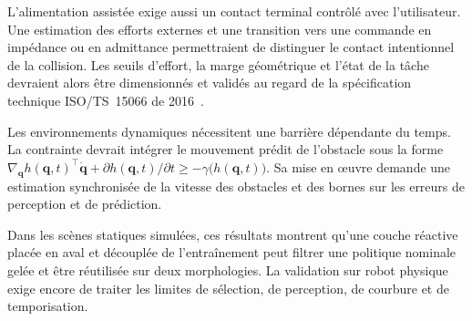 L'alimentation assistée exige aussi un contact terminal contrôlé avec l'utilisateur. Une estimation des efforts externes et une transition vers une commande en impédance ou en admittance permettraient de distinguer le contact intentionnel de la collision. Les seuils d'effort, la marge géométrique et l'état de la tâche devraient alors être dimensionnés et validés au regard de la spécification technique ISO/TS~15066 de 2016~\cite{Iso2016Robots}.

Les environnements dynamiques nécessitent une barrière dépendante du temps. La contrainte devrait intégrer le mouvement prédit de l'obstacle sous la forme $\nabla_{\mathbf q}h(\mathbf q,t)^{\top}\dot{\mathbf q}+\partial h(\mathbf q,t)/\partial t\geq-\gamma\bigl(h(\mathbf q,t)\bigr)$. Sa mise en œuvre demande une estimation synchronisée de la vitesse des obstacles et des bornes sur les erreurs de perception et de prédiction.

Dans les scènes statiques simulées, ces résultats montrent qu'une couche réactive placée en aval et découplée de l'entraînement peut filtrer une politique nominale gelée et être réutilisée sur deux morphologies. La validation sur robot physique exige encore de traiter les limites de sélection, de perception, de courbure et de temporisation.
